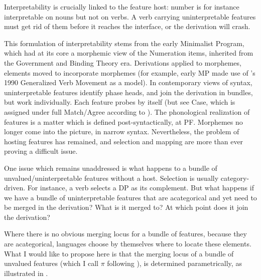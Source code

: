 \documentclass[output=paper
,modfonts
,nonflat]{langsci/langscibook}
\begin{document}
Interpretability is crucially linked to the feature host: number is for instance interpretable on nouns but not on verbs. A verb carrying uninterpretable features must get rid of them before it reaches the interface, or the derivation will crash.

This formulation of interpretability stems from the early Minimalist Program, which had at its core a morphemic view of the Numeration items, inherited from the Government and Binding Theory era. Derivations applied to morphemes, elements moved to incorporate morphemes (for example, early MP made use of \citeauthor{Belletti1990}'s 1990 Generalized Verb Movement as a model). In contemporary views of syntax, uninterpretable features identify phase heads, and join the derivation in bundles, but work individually. Each feature probes by itself (but see Case, which is assigned under full Match/Agree according to \citealt{Chomsky2000}). The phonological realization of features is a matter which is defined post-syntactically, at PF. Morphemes no longer come into the picture, in narrow syntax. Nevertheless, the problem of hosting features has remained, and selection and mapping are more than ever proving a difficult issue.

One issue which remains unaddressed is what happens to a bundle of unvalued/uninterpretable features without a host. Selection is usually category-driven. For instance, a verb selects a DP as its complement. But what happens if we have a bundle of uninterpretable features that are acategorical and yet need to be merged in the derivation? What is it merged to? At which point does it join the derivation?

Where there is no obvious merging locus for a bundle of features, because they are acategorical, languages choose by themselves where to locate these elements. What I would like to propose here is that the merging locus of a bundle of unvalued features (which I call $\pi $ following \citealt{D`Alessandro2017}), is determined parametrically, as illustrated in .
\end{document}
